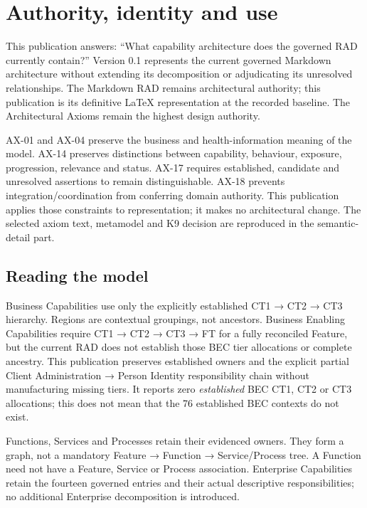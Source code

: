 \chapter{Authority, identity and use}\label{guide}

This publication answers: ``What capability architecture does the governed RAD currently contain?''
Version 0.1 represents the current governed Markdown architecture without extending
its decomposition or adjudicating its unresolved relationships. The Markdown RAD remains architectural authority;
this publication is its definitive LaTeX representation at the recorded baseline.
The Architectural Axioms remain the highest design authority.

AX-01 and AX-04 preserve the business and health-information meaning of the model.
AX-14 preserves distinctions between capability, behaviour, exposure, progression,
relevance and status. AX-17 requires established, candidate and unresolved assertions
to remain distinguishable. AX-18 prevents integration/coordination from conferring
domain authority. This publication applies those constraints to representation;
it makes no architectural change. The selected axiom text, metamodel and K9
decision are reproduced in the semantic-detail part.

\section{Reading the model}

Business Capabilities use only the explicitly established CT1 → CT2 → CT3
hierarchy. Regions are contextual groupings, not ancestors. Business Enabling
Capabilities require CT1 → CT2 → CT3 → FT for a fully reconciled Feature, but the
current RAD does not establish those BEC tier allocations or complete ancestry.
This publication preserves established owners and the explicit partial
Client Administration → Person Identity responsibility chain without manufacturing
missing tiers. It reports zero \emph{established} BEC CT1, CT2 or CT3 allocations;
this does not mean that the 76 established BEC contexts do not exist.

Functions, Services and Processes retain their evidenced owners. They form a graph,
not a mandatory Feature → Function → Service/Process tree. A Function need not
have a Feature, Service or Process association. Enterprise Capabilities retain the
fourteen governed entries and their actual descriptive responsibilities; no additional
Enterprise decomposition is introduced.

